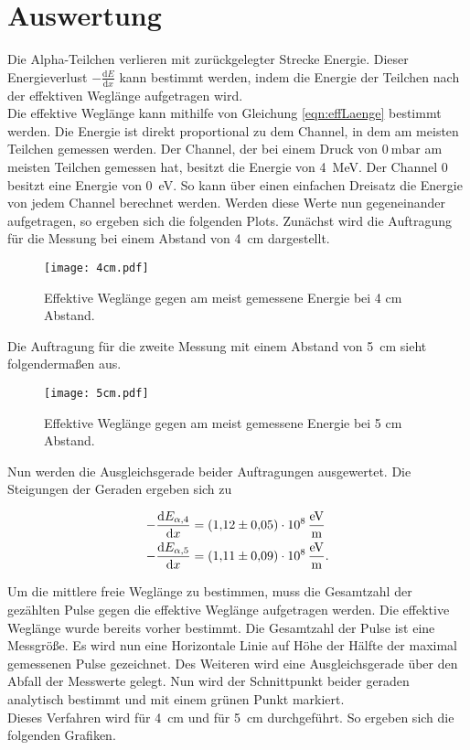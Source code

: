 %

%
\section{Auswertung}
\label{sec:Auswertung}

Die Alpha-Teilchen verlieren mit zurückgelegter Strecke Energie. Dieser Energieverlust $-\frac{\text{d} E}{\text{d} x}$ 
kann bestimmt werden, indem die Energie der Teilchen nach der effektiven Weglänge aufgetragen wird. \\
Die effektive Weglänge kann mithilfe von Gleichung \eqref{eqn:effLaenge} bestimmt werden.
\noindent Die Energie ist direkt proportional zu dem Channel, in dem am meisten Teilchen gemessen werden. Der Channel, der bei einem Druck von 
$\qty{0}{\milli \bar}$ am meisten Teilchen gemessen hat, besitzt die Energie von \qty{4}{\mega \eV}. Der Channel \num{0} 
besitzt eine Energie von \qty{0}{\eV}. So kann über einen einfachen Dreisatz die Energie von jedem Channel berechnet 
werden. Werden diese Werte nun gegeneinander aufgetragen, so ergeben sich die folgenden Plots.
Zunächst wird die Auftragung für die Messung bei einem Abstand von \qty{4}{\centi \meter} dargestellt.

\begin{figure}[H]
    \texttt{[image: 4cm.pdf]}
    \caption{Effektive Weglänge gegen am meist gemessene Energie bei 4 cm Abstand.}
\end{figure}

\noindent Die Auftragung für die zweite Messung mit einem Abstand von \qty{5}{\centi \meter} sieht folgendermaßen aus.

\begin{figure}[H] 
    \texttt{[image: 5cm.pdf]}
    \caption{Effektive Weglänge gegen am meist gemessene Energie bei 5 cm Abstand.}
\end{figure}

\noindent Nun werden die Ausgleichsgerade beider Auftragungen ausgewertet. Die Steigungen der Geraden ergeben sich zu 

\begin{align*}
    -\frac{\text{d} E_{\alpha, 4}}{\text{d} x} &= \qty{1.12 \pm 0.05 e8}{\eV \per \meter} \\
    -\frac{\text{d} E_{\alpha, 5}}{\text{d} x} &= \qty{1.11 \pm 0.09 e8}{\eV \per \meter}. \\
\end{align*}

\noindent Um die mittlere freie Weglänge zu bestimmen, muss die Gesamtzahl der gezählten Pulse gegen die effektive Weglänge aufgetragen werden. 
Die effektive Weglänge wurde bereits vorher bestimmt. Die Gesamtzahl der Pulse ist eine Messgröße. 
Es wird nun eine Horizontale Linie auf Höhe der Hälfte der maximal gemessenen Pulse gezeichnet. Des Weiteren wird eine Ausgleichsgerade über 
den Abfall der Messwerte gelegt. Nun wird der Schnittpunkt beider geraden analytisch bestimmt und mit einem grünen Punkt markiert.\\
\noindent Dieses Verfahren wird für \qty{4}{\centi \meter} und für \qty{5}{\centi \meter} durchgeführt. So ergeben sich die folgenden Grafiken.

